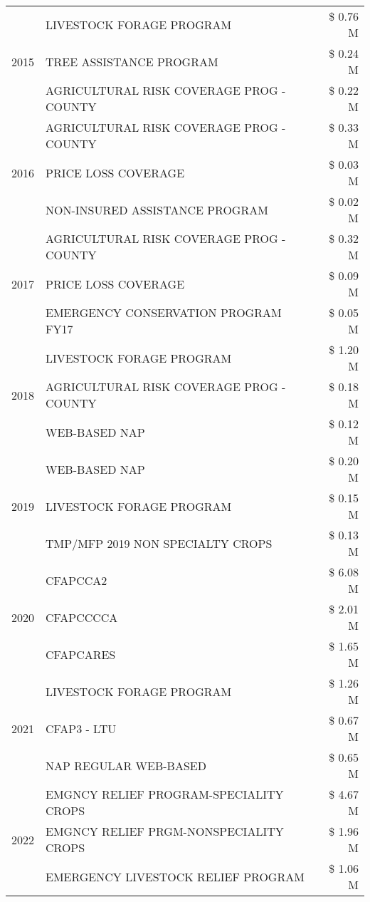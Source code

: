 \begin{tabular}{llr}
\cline{1-3}
\multirow[t]{3}{*}{2015} & LIVESTOCK FORAGE PROGRAM & \$ 0.76 M \\
 & TREE ASSISTANCE PROGRAM & \$ 0.24 M \\
 & AGRICULTURAL RISK COVERAGE PROG - COUNTY & \$ 0.22 M \\
\cline{1-3}
\multirow[t]{3}{*}{2016} & AGRICULTURAL RISK COVERAGE PROG - COUNTY & \$ 0.33 M \\
 & PRICE LOSS COVERAGE & \$ 0.03 M \\
 & NON-INSURED ASSISTANCE PROGRAM & \$ 0.02 M \\
\cline{1-3}
\multirow[t]{3}{*}{2017} & AGRICULTURAL RISK COVERAGE PROG - COUNTY & \$ 0.32 M \\
 & PRICE LOSS COVERAGE & \$ 0.09 M \\
 & EMERGENCY CONSERVATION PROGRAM FY17 & \$ 0.05 M \\
\cline{1-3}
\multirow[t]{3}{*}{2018} & LIVESTOCK FORAGE PROGRAM & \$ 1.20 M \\
 & AGRICULTURAL RISK COVERAGE PROG - COUNTY & \$ 0.18 M \\
 & WEB-BASED NAP & \$ 0.12 M \\
\cline{1-3}
\multirow[t]{3}{*}{2019} & WEB-BASED NAP & \$ 0.20 M \\
 & LIVESTOCK FORAGE PROGRAM & \$ 0.15 M \\
 & TMP/MFP 2019 NON SPECIALTY CROPS & \$ 0.13 M \\
\cline{1-3}
\multirow[t]{3}{*}{2020} & CFAPCCA2 & \$ 6.08 M \\
 & CFAPCCCCA & \$ 2.01 M \\
 & CFAPCARES & \$ 1.65 M \\
\cline{1-3}
\multirow[t]{3}{*}{2021} & LIVESTOCK FORAGE PROGRAM & \$ 1.26 M \\
 & CFAP3 - LTU & \$ 0.67 M \\
 & NAP REGULAR WEB-BASED & \$ 0.65 M \\
\cline{1-3}
\multirow[t]{3}{*}{2022} & EMGNCY RELIEF PROGRAM-SPECIALITY CROPS & \$ 4.67 M \\
 & EMGNCY RELIEF PRGM-NONSPECIALITY CROPS & \$ 1.96 M \\
 & EMERGENCY LIVESTOCK RELIEF PROGRAM & \$ 1.06 M \\
\cline{1-3}
\bottomrule
\end{tabular}
